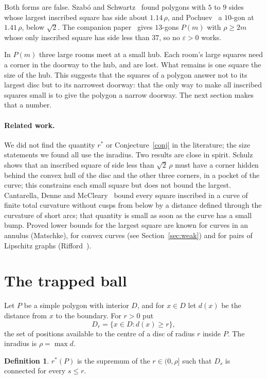 \documentclass[11pt,a4paper]{article}
\theoremstyle{definition}\newtheorem{definition}{Definition}
\theoremstyle{remark}\newtheorem{remark}{Remark}
\begin{document}
Both forms are false. Szab\'o and Schwartz~\cite{ss} found polygons with $5$ to
$9$ sides whose largest inscribed square has side about $1.14\,\rho$, and
Pochuev~\cite{pochuev} a $10$-gon at $1.41\,\rho$, below $\sqrt2$. The companion
paper~\cite{small} gives $13$-gons $P(m)$ with $\rho\ge 2m$ whose only inscribed
square has side less than $37$, so no $\varepsilon>0$ works.

In $P(m)$ three large rooms meet at a small hub. Each room's large squares need a
corner in the doorway to the hub, and are lost. What remains is one square the
size of the hub. This suggests that the squares of a polygon answer not to its
largest disc but to its narrowest doorway: that the only way to make all
inscribed squares small is to give the polygon a narrow doorway. The next
section makes that a number.

\paragraph{Related work.} We did not find the quantity $r^*$ or
Conjecture~\ref{conj} in the literature; the size statements we found all use
the inradius. Two results are close in spirit. Schulz~\cite{schulz} shows that
an inscribed square of side less than $\sqrt2\,\rho$ must have a corner hidden
behind the convex hull of the disc and the other three corners, in a pocket of
the curve; this constrains each small square but does not bound the largest.
Cantarella, Denne and McCleary~\cite{cdm} bound every square inscribed in a
curve of finite total curvature without cusps from below by a distance defined
through the curvature of short arcs; that quantity is small as soon as the curve
has a small bump. Proved lower bounds for the largest square are known for
curves in an annulus (Matschke), for convex curves (see Section~\ref{sec:weak}) and
for pairs of Lipschitz graphs (Rifford~\cite{rifford}).

\section{The trapped ball}

Let $P$ be a simple polygon with interior $D$, and for $x\in D$ let $d(x)$ be the
distance from $x$ to the boundary. For $r>0$ put
\[
  D_r=\{x\in D : d(x)\ge r\},
\]
the set of positions available to the centre of a disc of radius $r$ inside $P$.
The inradius is $\rho=\max d$.

\begin{definition}
$r^*(P)$ is the supremum of the $r\in(0,\rho]$ such that $D_s$ is connected for
every $s\le r$.
\end{definition}
\end{document}
